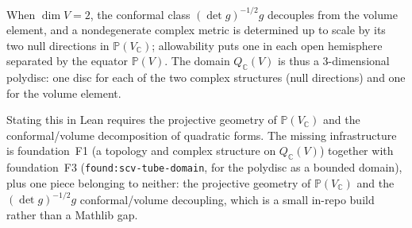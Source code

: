 \begin{proposition}[$Q_{\mathbb C}(V)$ is a polydisc when $\dim V = 2$; KS p.~15]
  \label{prop:two-dim-polydisc}
  \notready
  When $\dim V = 2$, the conformal class $(\det g)^{-1/2} g$ decouples from
  the volume element, and a nondegenerate complex metric is determined up to
  scale by its two null directions in $\mathbb P(V_{\mathbb C})$;
  allowability puts one in each open hemisphere separated by the equator
  $\mathbb P(V)$. The domain $Q_{\mathbb C}(V)$ is thus a $3$-dimensional
  polydisc: one disc for each of the two complex structures (null
  directions) and one for the volume element.

  Stating this in Lean requires the projective geometry of
  $\mathbb P(V_{\mathbb C})$ and the conformal/volume decomposition of
  quadratic forms. The missing infrastructure is foundation~F1 (a topology
  and complex structure on $Q_{\mathbb C}(V)$) together with foundation~F3
  (\texttt{found:scv-tube-domain}, for the polydisc as a bounded domain),
  plus one piece belonging to neither: the projective geometry of
  $\mathbb P(V_{\mathbb C})$ and the $(\det g)^{-1/2}g$ conformal/volume
  decoupling, which is a small in-repo build rather than a Mathlib gap.
\end{proposition}






